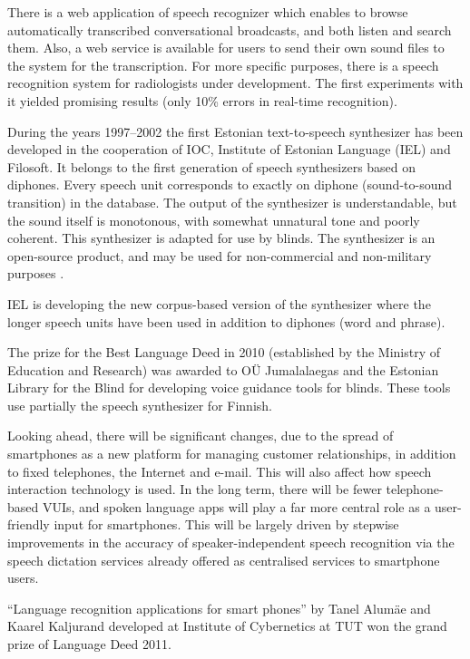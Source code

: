 \documentclass[]{../metanetpaper}
\begin{document}
\begin{multicols}{2}
There is a web application of speech recognizer which enables to browse automatically transcribed conversational broadcasts, and both listen and search them. 
Also, a web service is available for users to send their own sound files to the system for the transcription. 
For more specific purposes, there is a speech recognition system for radiologists under development. 
The first experiments with it yielded promising results (only 10\% errors in real-time recognition).

During the years 1997--2002 the first Estonian text-to-speech synthesizer has been developed in the cooperation of IOC, Institute of Estonian Language (IEL) and Filosoft. 
It belongs to the first generation of speech synthesizers based on diphones. 
Every speech unit corresponds to exactly on diphone (sound-to-sound transition) in the database. 
The output of the synthesizer is understandable, but the sound itself is monotonous, with somewhat unnatural tone and poorly coherent. 
This synthesizer is adapted for use by blinds. 
The synthesizer is an open-source product, and may be used for non-commercial and non-military purposes \cite{IEL}. 

IEL is developing the new corpus-based version of the synthesizer where the longer speech units have been used in addition to diphones (word and phrase). 

The prize for the Best Language Deed in 2010 (established by the Ministry of Education and Research) was awarded to OÜ Jumalalaegas and the Estonian Library for the Blind for developing voice guidance tools for blinds. 
These tools use partially the speech synthesizer for Finnish.

Looking ahead, there will be significant changes, due to the spread of smartphones as a new platform for managing customer relationships, in addition to fixed telephones, the Internet and e-mail. This will also affect how speech interaction technology is used. In the long term, there will be fewer telephone-based VUIs, and spoken language apps will play a far more central role as a user-friendly input for smartphones. This will be largely driven by stepwise improvements in the accuracy of speaker-independent speech recognition via the speech dictation services already offered as centralised services to smartphone users. 

``Language recognition applications for smart phones'' by Tanel Alumäe
and Kaarel Kaljurand  developed at Institute of Cybernetics at TUT won
the grand prize of Language Deed 2011. 


\end{multicols}
\end{document}
